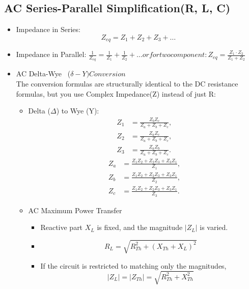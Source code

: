 \documentclass{article}
\begin{document}
\begin{enumerate}
\section{AC Series-Parallel Simplification(R, L, C)}
\begin{itemize}
    \item Impedance in Series: $$ Z_{eq} = Z_1 + Z_2 + Z_3+\dots$$
    \item Impedance in Parallel: $\frac{1}{Z_{eq}} = \frac{1}{Z_1} + \frac{1}{Z_2} + \dots or for two component : Z_{eq} = \frac{Z_1\cdot Z_2}{Z_1 + Z_2}$
    \item AC Delta-Wye \ ($\delta-Y) Conversion$ \\
    The conversion formulas are structurally identical to the DC resistance formulas, but you use Complex Impedance(Z) instead of just R:
    \begin{itemize}
        \item Delta ($\Delta$) to Wye (Y):
\begin{align*}
Z_1 &= \frac{Z_bZ_c}{Z_a + Z_b + Z_c},\\
Z_2 &= \frac{Z_aZ_c}{Z_a + Z_b + Z_c},\\
Z_3 &= \frac{Z_aZ_b}{Z_a + Z_b + Z_c}.
\end{align*}
       \begin{align*}
Z_a &= \frac{Z_1Z_2 + Z_2Z_3 + Z_3Z_1}{Z_1},\\
Z_b &= \frac{Z_1Z_2 + Z_2Z_3 + Z_3Z_1}{Z_2},\\
Z_c &= \frac{Z_1Z_2 + Z_2Z_3 + Z_3Z_1}{Z_3}.
\end{align*}
        \item AC Maximum Power Transfer
\begin{itemize}
    \item Reactive part $X_L$ is fixed, and the magnitude $|Z_L|$ is varied.
    \item
    \[
    R_L=\sqrt{R_{Th}^{2}+\left(X_{Th}+X_L\right)^{2}}
    \]
    \item If the circuit is restricted to matching only the magnitudes,
    \[
    |Z_L|=|Z_{Th}|=\sqrt{R_{Th}^{2}+X_{Th}^{2}}
    \]
\end{itemize}
    \end{itemize}
   
\end{itemize}

\end{enumerate}
\end{document}
